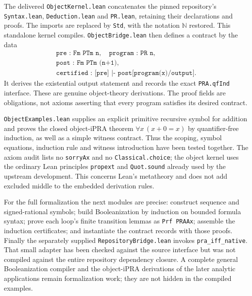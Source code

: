 The delivered \texttt{ObjectKernel.lean} concatenates the pinned repository's
\texttt{Syntax.lean}, \texttt{Deduction.lean} and \texttt{PR.lean}, retaining
their declarations and proofs.  The imports are replaced by \texttt{Std},
with the notation $\mathbb N$ restored.  This standalone kernel compiles.
\texttt{ObjectBridge.lean} then defines a contract by the data
\[
\begin{array}{l}
 \texttt{pre : Fm PTm n},\quad \texttt{program : PR n},\\
 \texttt{post : Fm PTm (n+1)},\\
 \texttt{certified : [pre] |- post[program(x)/output]}.
\end{array}
\]
It derives the existential output statement and records the exact
\texttt{PRA.qfInd} interface.  These are genuine object-theory derivations.
The proof fields are obligations, not axioms asserting that every program
satisfies its desired contract.

\texttt{ObjectExamples.lean} supplies an explicit primitive recursive symbol
for addition and proves the closed object-iPRA theorem
$\forall x\,(x+0=x)$ by quantifier-free induction, as well as a simple witness
contract.  Thus the scoping, symbol equations, induction rule and witness
introduction have been tested together.  The axiom audit lists no
\texttt{sorryAx} and no \texttt{Classical.choice}; the object kernel uses the
ordinary Lean principles \texttt{propext} and \texttt{Quot.sound} already used
by the upstream development.  This concerns Lean's metatheory and does not
add excluded middle to the embedded derivation rules.

For the full formalization the next modules are precise: construct sequence
and signed-rational symbols; build Booleanization by induction on bounded
formula syntax; prove each loop's finite transition lemmas as
\texttt{Prf PRAAx}; assemble the induction certificates; and instantiate the
contract records with those proofs.  Finally the separately supplied
\texttt{RepositoryBridge.lean} invokes \texttt{pra\_iff\_native}.  That small
adapter has been checked against the source interface but was not compiled
against the entire repository dependency closure.  A complete general
Booleanization compiler and the object-iPRA derivations of the later analytic
applications remain formalization work; they are not hidden in the compiled
examples.
